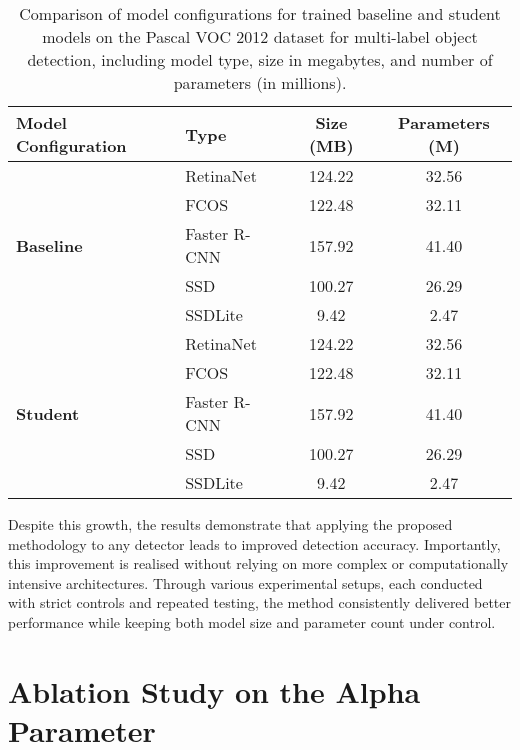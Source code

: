 \begin{table}[!ht]
    \centering
    \begin{tabular}{llcc}
        \toprule
        \textbf{Model Configuration} & \textbf{Type} & \textbf{Size (MB)} & \textbf{Parameters (M)} \\
        \midrule
        \multirow{5}{*}{\textbf{Baseline}} 
            & RetinaNet     & 124.22 & 32.56 \\
            & FCOS          & 122.48 & 32.11 \\
            & Faster R-CNN  & 157.92 & 41.40 \\
            & SSD           & 100.27 & 26.29 \\
            & SSDLite       & 9.42   & 2.47 \\
        \midrule
        \multirow{5}{*}{\textbf{Student}} 
            & RetinaNet     & 124.22 & 32.56 \\
            & FCOS          & 122.48 & 32.11 \\
            & Faster R-CNN  & 157.92 & 41.40 \\
            & SSD           & 100.27 & 26.29 \\
            & SSDLite       & 9.42   & 2.47 \\
        \bottomrule
    \end{tabular}
    \caption{Comparison of model configurations for trained baseline and student models on the Pascal VOC 2012 dataset for multi-label object detection, including model type, size in megabytes, and number of parameters (in millions).}
    \label{tab:model_configs_pascal_voc}
\end{table}

Despite this growth, the results demonstrate that applying the proposed methodology to any detector leads to improved detection accuracy. Importantly, this improvement is realised without relying on more complex or computationally intensive architectures. Through various experimental setups, each conducted with strict controls and repeated testing, the method consistently delivered better performance while keeping both model size and parameter count under control.


\section{Ablation Study on the Alpha Parameter}
\label{sec:5_alpha_exp}

